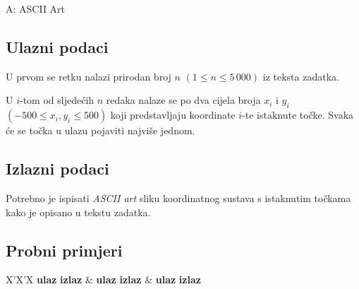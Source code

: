 \begin{statement}[
  timelimit=1 s,
  memorylimit=512 MiB,
]{A: ASCII Art}
\subsection*{Ulazni podaci}
  U prvom se retku nalazi prirodan broj $n$ $(1 \le n \le 5\,000)$ iz teksta
zadatka.

U $i$-tom od sljedećih $n$ redaka nalaze se po dva cijela broja $x_i$ i
$y_i$ $(-500 \le x_i, y_i \le 500)$ koji predstavljaju koordinate $i$-te
istaknute točke. Svaka će se točka u ulazu pojaviti najviše jednom.

\subsection*{Izlazni podaci}
Potrebno je ispisati \textit{ASCII art} sliku koordinatnog sustava s
istaknutim točkama kako je opisano u tekstu zadatka.

\subsection*{Probni primjeri}
\begin{tabularx}{\textwidth}{X'X'X}
  \textbf{ulaz}
  \linespread{1}{}
  \textbf{izlaz}
  \linespread{1}{} &
  \textbf{ulaz}
  \linespread{1}{}
  \textbf{izlaz}
  \linespread{1}{} &
  \textbf{ulaz}
  \linespread{1}{}
  \textbf{izlaz}
  \linespread{1}{}
\end{tabularx}

\end{statement}


